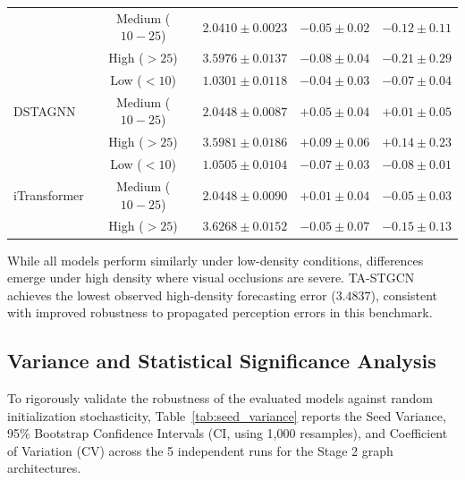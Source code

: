\documentclass[journal,twocolumn]{IEEEtran}
\begin{document}
\begin{table}[htbp]
{\begin{tabular}{lcccc}
 & Medium ($10-25$) & $2.0410 \pm 0.0023$ & $-0.05 \pm 0.02$ & $-0.12 \pm 0.11$ \\
 & High ($>25$) & $3.5976 \pm 0.0137$ & $-0.08 \pm 0.04$ & $-0.21 \pm 0.29$ \\
\midrule
\multirow{3}{*}{DSTAGNN} & Low ($<10$) & $1.0301 \pm 0.0118$ & $-0.04 \pm 0.03$ & $-0.07 \pm 0.04$ \\
 & Medium ($10-25$) & $2.0448 \pm 0.0087$ & $+0.05 \pm 0.04$ & $+0.01 \pm 0.05$ \\
 & High ($>25$) & $3.5981 \pm 0.0186$ & $+0.09 \pm 0.06$ & $+0.14 \pm 0.23$ \\
\midrule
\multirow{3}{*}{iTransformer} & Low ($<10$) & $1.0505 \pm 0.0104$ & $-0.07 \pm 0.03$ & $-0.08 \pm 0.01$ \\
 & Medium ($10-25$) & $2.0448 \pm 0.0090$ & $+0.01 \pm 0.04$ & $-0.05 \pm 0.03$ \\
 & High ($>25$) & $3.6268 \pm 0.0152$ & $-0.05 \pm 0.07$ & $-0.15 \pm 0.13$ \\
\bottomrule
\end{tabular}%
}
\end{table}

While all models perform similarly under low-density conditions, differences emerge under high density where visual occlusions are severe. TA-STGCN achieves the lowest observed high-density forecasting error ($3.4837$), consistent with improved robustness to propagated perception errors in this benchmark.

\subsection{Variance and Statistical Significance Analysis}
\label{sec:variance_analysis}

To rigorously validate the robustness of the evaluated models against random initialization stochasticity, Table~\ref{tab:seed_variance} reports the Seed Variance, 95\% Bootstrap Confidence Intervals (CI, using 1,000 resamples), and Coefficient of Variation (CV) across the 5 independent runs for the Stage 2 graph architectures.
\end{document}
